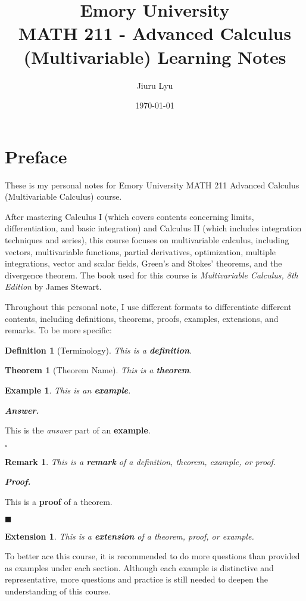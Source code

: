 \documentclass[12pt,a4paper]{article}
\title{Emory University\\\textbf{MATH 211 - Advanced Calculus (Multivariable) Learning Notes}}
\author{Jiuru Lyu}
\date{\today}
\newtheorem{thm}{Theorem}[subsection]
\newtheorem{df}{Definition}[subsection]
\newtheorem{eg}{Example}[subsection]
\newenvironment*{ans}{\par\indent\textbf{\textit{Answer. }}\par}{\par\hfill{$\square$}\par}
\newtheorem*{rmk}{\indent Remark}
\newenvironment*{prf}{\par\indent\textbf{\textit{Proof. }}\par}{\par\hfill$\blacksquare$\par}
\newtheorem*{ext}{\indent Extension}
\begin{document}
\maketitle
\tableofcontents
\newpage

\section*{Preface}
These is my personal notes for Emory University MATH 211 Advanced Calculus (Multivariable Calculus) course. 

After mastering Calculus I (which covers contents concerning limits, differentiation, and basic integration) and Calculus II (which includes integration techniques and series), this course focuses on multivariable calculus, including vectors, multivariable functions, partial derivatives, optimization, multiple integrations, vector and scalar fields, Green’s and Stokes’ theorems, and the divergence theorem. The book used for this course is \textit{Multivariable Calculus, 8th Edition} by James Stewart. 

Throughout this personal note, I use different formats to differentiate different contents, including definitions, theorems, proofs, examples, extensions, and remarks. To be more specific: 
\begin{df}[Terminology]
    This is a \textbf{definition}.	
\end{df}
\begin{thm}[Theorem Name]
    This is a \textbf{theorem}.	
\end{thm}
\begin{eg}
    This is  an \textbf{example}. 
\end{eg}

\begin{ans}
    This is the \textit{answer} part of an \textbf{example}. 
\end{ans}
\begin{rmk}
	This is a \textbf{remark} of a definition, theorem, example, or proof. 
\end{rmk}

\begin{prf}
	This is a \textbf{proof} of a theorem. 
\end{prf}
\begin{ext}
	This is a \textbf{extension} of a theorem, proof, or example. 	
\end{ext}
To better ace this course, it is recommended to do more questions than provided as examples under each section. Although each example is distinctive and representative, more questions and practice is still needed to deepen the understanding of this course. 
\end{document}
